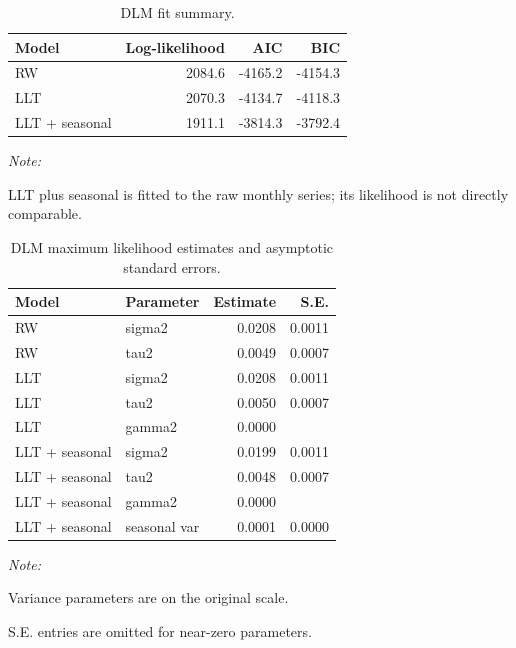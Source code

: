 \documentclass[
  10pt,
]{article}
\begin{document}
\begin{table}

\caption{\label{tab:dlm-fit-table}\label{tbl:dlm-fit}DLM fit summary.}
\centering
\begin{threeparttable}
\begin{tabular}[t]{lrrr}
\toprule
Model & Log-likelihood & AIC & BIC\\
\midrule
RW & 2084.6 & -4165.2 & -4154.3\\
LLT & 2070.3 & -4134.7 & -4118.3\\
LLT + seasonal & 1911.1 & -3814.3 & -3792.4\\
\bottomrule
\end{tabular}
\begin{tablenotes}
\item \textit{Note: } 
\item LLT plus seasonal is fitted to the raw monthly series; its likelihood is not directly comparable.
\end{tablenotes}
\end{threeparttable}
\end{table}

\begin{table}

\caption{\label{tab:dlm-param-table}\label{tbl:dlm-params}DLM maximum likelihood estimates and asymptotic standard errors.}
\centering
\begin{threeparttable}
\begin{tabular}[t]{llrr}
\toprule
Model & Parameter & Estimate & S.E.\\
\midrule
RW & sigma2 & 0.0208 & 0.0011\\
RW & tau2 & 0.0049 & 0.0007\\
\addlinespace
LLT & sigma2 & 0.0208 & 0.0011\\
LLT & tau2 & 0.0050 & 0.0007\\
LLT & gamma2 & 0.0000 & \\
\addlinespace
LLT + seasonal & sigma2 & 0.0199 & 0.0011\\
LLT + seasonal & tau2 & 0.0048 & 0.0007\\
LLT + seasonal & gamma2 & 0.0000 & \\
LLT + seasonal & seasonal var & 0.0001 & 0.0000\\
\bottomrule
\end{tabular}
\begin{tablenotes}
\item \textit{Note: } 
\item Variance parameters are on the original scale.
\item S.E. entries are omitted for near-zero parameters.
\end{tablenotes}
\end{threeparttable}
\end{table}
\end{document}
